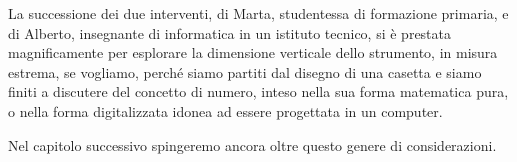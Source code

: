 La successione dei due interventi, di Marta, studentessa di formazione primaria, e di Alberto, insegnante di informatica in un istituto tecnico, si è prestata magnificamente per esplorare la dimensione verticale dello strumento, in misura estrema, se vogliamo, perché siamo partiti dal disegno di una casetta e siamo finiti a discutere del concetto di numero, inteso nella sua forma matematica pura, o nella forma digitalizzata idonea ad essere progettata in un computer.

Nel capitolo successivo spingeremo ancora oltre questo genere di considerazioni. 

                                                                                                                                                                                                   
  




























